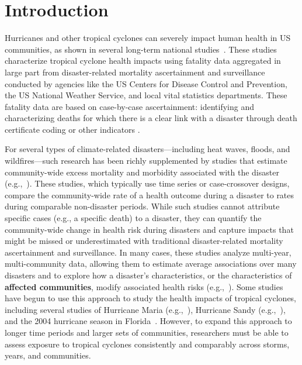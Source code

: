 \section*{Introduction}

\acresetall

Hurricanes and other tropical cyclones can severely impact human health in
\ac{US} communities, as shown in several long-term national
studies~\parencite{rappaport2000, rappaport2014fatalities,
rappaport2016fatalities, czajkowski2010fatal, czajkowski2011, moore2012}.
These studies characterize tropical cyclone health impacts using fatality data
aggregated in large part from disaster-related mortality ascertainment and
surveillance conducted by agencies like the \ac{US} Centers for Disease Control
and Prevention, the \ac{US} National Weather Service, and local vital
statistics departments. These fatality data are based on case-by-case
ascertainment: identifying and characterizing deaths for which there is a clear
link with a disaster through death certificate coding or other indicators
\parencite{rocha2017medicolegal}.  

For several types of climate-related disasters---including heat waves, floods,
and wildfires---such research has been richly supplemented by studies that
estimate community-wide excess mortality and morbidity associated with the
disaster (e.g.,~\cite{anderson2010heat, son2012impact, haikerwal2015impact,
liu2017wildfire, milojevic2017mental}).  These studies, which typically use time
series or case-crossover designs, compare the community-wide rate of a health
outcome during a disaster to rates during comparable
non-disaster periods.  While such studies cannot attribute specific cases
(e.g., a specific death) to a disaster, they can quantify the community-wide
change in health risk during disasters and capture impacts that might be missed
or underestimated with traditional disaster-related mortality ascertainment and
surveillance.  In many cases, these studies analyze multi-year, multi-community
data, allowing them to estimate average associations over many disasters and to
explore how a disaster's characteristics, or the characteristics of 
\textbf{affected communities}, modify associated health risks
(e.g.,~\cite{anderson2010heat, son2012impact, liu2017wildfire}).  Some studies
have begun to use this approach to study the health impacts of tropical
cyclones, including several studies of Hurricane Maria
(e.g.,~\cite{santos2018use, santos2018differential}), Hurricane Sandy
(e.g.,~\cite{kim2016, mongin2017, swerdel2014}), and the 2004 hurricane season
in Florida~\parencite{mckinney2011}.  However, to expand this approach to
longer time periods and larger sets of communities, researchers must be able to
assess exposure to tropical cyclones consistently and comparably across storms,
years, and communities.  

